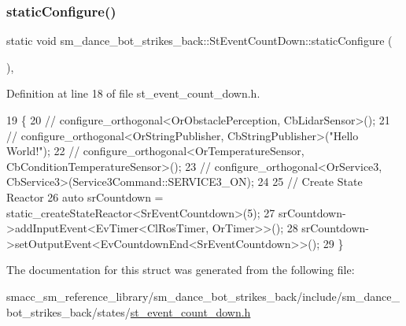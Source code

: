 \subsubsection{\texorpdfstring{static\+Configure()}{staticConfigure()}}
{\footnotesize\ttfamily static void sm\+\_\+dance\+\_\+bot\+\_\+strikes\+\_\+back\+::\+St\+Event\+Count\+Down\+::static\+Configure (\begin{DoxyParamCaption}{ }\end{DoxyParamCaption})\hspace{0.3cm}{\ttfamily [inline]}, {\ttfamily [static]}}



Definition at line 18 of file st\+\_\+event\+\_\+count\+\_\+down.\+h.


\begin{DoxyCode}
19     \{
20         \textcolor{comment}{//   configure\_orthogonal<OrObstaclePerception, CbLidarSensor>();}
21         \textcolor{comment}{//   configure\_orthogonal<OrStringPublisher, CbStringPublisher>("Hello World!");}
22         \textcolor{comment}{//   configure\_orthogonal<OrTemperatureSensor, CbConditionTemperatureSensor>();}
23         \textcolor{comment}{//   configure\_orthogonal<OrService3, CbService3>(Service3Command::SERVICE3\_ON);        }
24         
25         \textcolor{comment}{// Create State Reactor}
26         \textcolor{keyword}{auto} srCountdown = static\_createStateReactor<SrEventCountdown>(5);        
27         srCountdown->addInputEvent<EvTimer<ClRosTimer, OrTimer>>();
28         srCountdown->setOutputEvent<EvCountdownEnd<SrEventCountdown>>();
29     \}
\end{DoxyCode}


The documentation for this struct was generated from the following file\+:\begin{DoxyCompactItemize}
\item 
smacc\+\_\+sm\+\_\+reference\+\_\+library/sm\+\_\+dance\+\_\+bot\+\_\+strikes\+\_\+back/include/sm\+\_\+dance\+\_\+bot\+\_\+strikes\+\_\+back/states/\hyperlink{strikes__back_2include_2sm__dance__bot__strikes__back_2states_2st__event__count__down_8h}{st\+\_\+event\+\_\+count\+\_\+down.\+h}\end{DoxyCompactItemize}
